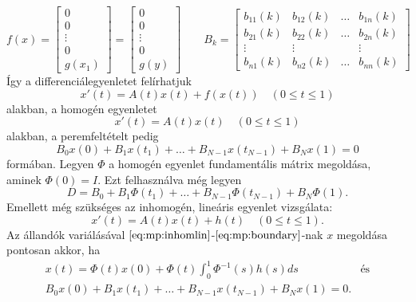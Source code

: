 \documentclass[oneside, titlepage, 12pt, a4paper]{report}
\begin{document}
\begin{equation*}
f(x) =
	\begin{bmatrix}
		0 \\ 0 \\ \vdots \\ 0 \\ g(x_1)
	\end{bmatrix}
=
	\begin{bmatrix}
		0 \\ 0 \\ \vdots \\ 0 \\ g(y)
	\end{bmatrix}
\qquad
B_k =
	\begin{bmatrix}
		b_{11}(k) & b_{12}(k) & \dots & b_{1n}(k) \\
		b_{21}(k) & b_{22}(k) & \dots & b_{2n}(k) \\
		\vdots & \vdots && \vdots \\
		b_{n1}(k) & b_{n2}(k) & \dots & b_{nn}(k)
	\end{bmatrix}
\end{equation*}
Így a differenciálegyenletet felírhatjuk 
\begin{equation}
x'(t) = A(t) x(t) + f(x(t)) \quad (0 \leq t \leq 1) \label{eq:mp:inhom}
\end{equation}
alakban, a homogén egyenletet
\begin{equation}
x'(t) = A(t) x(t) \quad (0 \leq t \leq 1) \label{eq:mp:hom}
\end{equation}
alakban, a peremfeltételt pedig
\begin{equation}
B_0 x(0) + B_1 x(t_1) + \dots + B_{N-1} x(t_{N-1}) + B_N x(1) = 0 \label{eq:mp:boundary}
\end{equation}
formában. Legyen $\Phi$ a homogén egyenlet fundamentális mátrix megoldása, aminek $\Phi(0) = I$. Ezt felhasználva még legyen
\begin{equation*}
D = B_0 + B_1 \Phi(t_1) + \dots + B_{N-1} \Phi(t_{N-1}) + B_N \Phi(1).
\end{equation*}
Emellett még szükséges az inhomogén, lineáris egyenlet vizsgálata:
\begin{equation}
x'(t) = A(t) x(t) + h(t) \quad (0 \leq t \leq 1). \label{eq:mp:inhomlin}
\end{equation}
Az állandók variálásával $\eqref{eq:mp:inhomlin}$-$\eqref{eq:mp:boundary}$-nak $x$ megoldása pontosan akkor, ha
\begin{align*}
&x(t) = \Phi(t) x(0) + \Phi(t) \int_0^1 \Phi^{-1}(s) h(s) ds &\text{és}& \\
&B_0 x(0) + B_1 x(t_1) + \dots + B_{N-1} x(t_{N-1}) + B_N x(1) = 0.&&
\end{align*}
\end{document}

